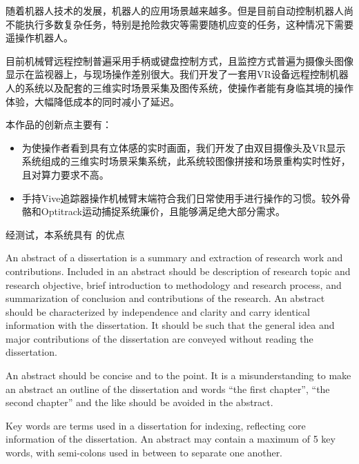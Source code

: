 % 
% 
\begin{cabstract}
随着机器人技术的发展，机器人的应用场景越来越多。但是目前自动控制机器人尚不能执行多数复杂任务，特别是抢险救灾等需要随机应变的任务，这种情况下需要遥操作机器人。

目前机械臂远程控制普遍采用手柄或键盘控制方式，且监控方式普遍为摄像头图像显示在监视器上，与现场操作差别很大。我们开发了一套用VR设备远程控制机器人的系统以及配套的三维实时场景采集及图传系统，使操作者能有身临其境的操作体验，大幅降低成本的同时减小了延迟。



  本作品的创新点主要有：
  \begin{itemize}
    \item 为使操作者看到具有立体感的实时画面，我们开发了由双目摄像头及VR显示系统组成的三维实时场景采集系统，此系统较图像拼接和场景重构实时性好，且对算力要求不高。
    \item 手持Vive追踪器操作机械臂末端符合我们日常使用手进行操作的习惯。较外骨骼和Optitrack运动捕捉系统廉价，且能够满足绝大部分需求。
  \end{itemize}

经测试，本系统具有   的优点



\end{cabstract}


\begin{eabstract}
   An abstract of a dissertation is a summary and extraction of research work
   and contributions. Included in an abstract should be description of research
   topic and research objective, brief introduction to methodology and research
   process, and summarization of conclusion and contributions of the
   research. An abstract should be characterized by independence and clarity and
   carry identical information with the dissertation. It should be such that the
   general idea and major contributions of the dissertation are conveyed without
   reading the dissertation.

   An abstract should be concise and to the point. It is a misunderstanding to
   make an abstract an outline of the dissertation and words ``the first
   chapter'', ``the second chapter'' and the like should be avoided in the
   abstract.

   Key words are terms used in a dissertation for indexing, reflecting core
   information of the dissertation. An abstract may contain a maximum of 5 key
   words, with semi-colons used in between to separate one another.
\end{eabstract}

